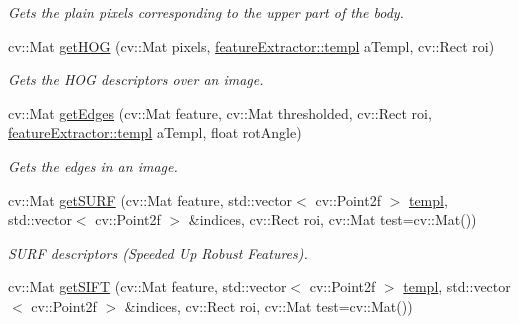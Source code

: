 \begin{DoxyCompactItemize}
\begin{DoxyCompactList}\small\item\em Gets the plain pixels corresponding to the upper part of the body. \item\end{DoxyCompactList}\item 
\hypertarget{classfeatureExtractor_a7a7c8515961c9eb104e1e8faae18412f}{
cv::Mat \hyperlink{classfeatureExtractor_a7a7c8515961c9eb104e1e8faae18412f}{getHOG} (cv::Mat pixels, \hyperlink{structfeatureExtractor_1_1templ}{featureExtractor::templ} aTempl, cv::Rect roi)}
\label{classfeatureExtractor_a7a7c8515961c9eb104e1e8faae18412f}

\begin{DoxyCompactList}\small\item\em Gets the HOG descriptors over an image. \item\end{DoxyCompactList}\item 
\hypertarget{classfeatureExtractor_a2f5da328c58a1f7faaa9765c682e7d16}{
cv::Mat \hyperlink{classfeatureExtractor_a2f5da328c58a1f7faaa9765c682e7d16}{getEdges} (cv::Mat feature, cv::Mat thresholded, cv::Rect roi, \hyperlink{structfeatureExtractor_1_1templ}{featureExtractor::templ} aTempl, float rotAngle)}
\label{classfeatureExtractor_a2f5da328c58a1f7faaa9765c682e7d16}

\begin{DoxyCompactList}\small\item\em Gets the edges in an image. \item\end{DoxyCompactList}\item 
\hypertarget{classfeatureExtractor_abe06d4d1aae133750e264cc1b66a5028}{
cv::Mat \hyperlink{classfeatureExtractor_abe06d4d1aae133750e264cc1b66a5028}{getSURF} (cv::Mat feature, std::vector$<$ cv::Point2f $>$ \hyperlink{structfeatureExtractor_1_1templ}{templ}, std::vector$<$ cv::Point2f $>$ \&indices, cv::Rect roi, cv::Mat test=cv::Mat())}
\label{classfeatureExtractor_abe06d4d1aae133750e264cc1b66a5028}

\begin{DoxyCompactList}\small\item\em SURF descriptors (Speeded Up Robust Features). \item\end{DoxyCompactList}\item 
\hypertarget{classfeatureExtractor_ae0a25673baa0c649ae95fc7890f0b8c6}{
cv::Mat \hyperlink{classfeatureExtractor_ae0a25673baa0c649ae95fc7890f0b8c6}{getSIFT} (cv::Mat feature, std::vector$<$ cv::Point2f $>$ \hyperlink{structfeatureExtractor_1_1templ}{templ}, std::vector$<$ cv::Point2f $>$ \&indices, cv::Rect roi, cv::Mat test=cv::Mat())}
\label{classfeatureExtractor_ae0a25673baa0c649ae95fc7890f0b8c6}


\end{DoxyCompactItemize}
